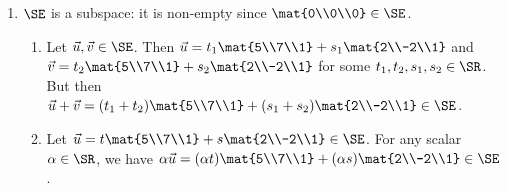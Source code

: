 \begin{exercises}
\begin{problist}
\begin{solution}
\begin{enumerate}
				\item $\SE$ is a subspace: it is non-empty since $\mat{0\\0\\0}\in\SE$. 
				\begin{enumerate}
					\item Let $\vec u,\vec v\in \SE$. Then $\vec u=t_1\mat{5\\7\\1}+s_1\mat{2\\-2\\1}$ and $\vec v=t_2\mat{5\\7\\1}+s_2\mat{2\\-2\\1}$ for some $t_1,t_2,s_1,s_2\in\SR$. But then $\vec u+\vec v=(t_1+t_2)\mat{5\\7\\1}+(s_1+s_2)\mat{2\\-2\\1}\in \SE$.
					\item Let $\vec u=t\mat{5\\7\\1}+s\mat{2\\-2\\1}\in\SE$. For any scalar $\alpha\in\SR$, we have $\alpha\vec u=(\alpha t)\mat{5\\7\\1}+(\alpha s)\mat{2\\-2\\1}\in\SE$.
				\end{enumerate}
			\end{enumerate}

		\end{solution}		


\end{problist}
\end{exercises}
